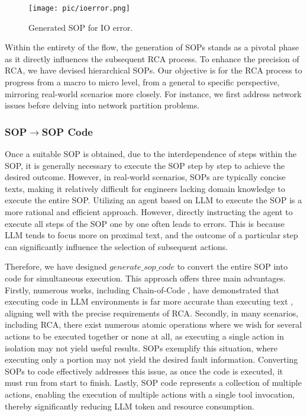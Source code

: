 \begin{figure}[htbp]
\centerline{\texttt{[image: pic/ioerror.png]}}
\caption{Generated SOP for IO error.}
\label{fig:ioerror}
\end{figure}

Within the entirety of the flow, the generation of SOPs stands as a pivotal phase as it directly influences the subsequent RCA process. To enhance the precision of RCA, we have devised hierarchical SOPs. Our objective is for the RCA process to progress from a macro to micro level, from a general to specific perspective, mirroring real-world scenarios more closely. For instance, we first address network issues before delving into network partition problems.

\subsubsection{SOP$\rightarrow$SOP Code}

Once a suitable SOP is obtained, due to the interdependence of steps within the SOP, it is generally necessary to execute the SOP step by step to achieve the desired outcome. However, in real-world scenarios, SOPs are typically concise texts, making it relatively difficult for engineers lacking domain knowledge to execute the entire SOP. Utilizing an agent based on LLM to execute the SOP is a more rational and efficient approach. However, directly instructing the agent to execute all steps of the SOP one by one often leads to errors. This is because LLM tends to focus more on proximal text, and the outcome of a particular step can significantly influence the selection of subsequent actions.

Therefore, we have designed $generate\_sop\_code$ to convert the entire SOP into code for simultaneous execution. This approach offers three main advantages. Firstly, numerous works, including Chain-of-Code \citep{li2023chainofcode}, have demonstrated that executing code in LLM environments is far more accurate than executing text \citep{pan2023logiclm}, aligning well with the precise requirements of RCA. Secondly, in many scenarios, including RCA, there exist numerous atomic operations where we wish for several actions to be executed together or none at all, as executing a single action in isolation may not yield useful results. SOPs exemplify this situation, where executing only a portion may not yield the desired fault information. Converting SOPs to code effectively addresses this issue, as once the code is executed, it must run from start to finish. Lastly, SOP code represents a collection of multiple actions, enabling the execution of multiple actions with a single tool invocation, thereby significantly reducing LLM token and resource consumption.

